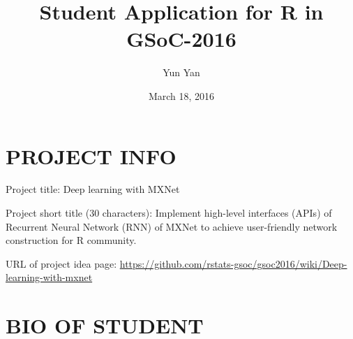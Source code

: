 \documentclass[]{article}
\title{Student Application for R in GSoC-2016}
\author{Yun Yan}
\date{March 18, 2016}
\begin{document}
\maketitle

\section{PROJECT INFO}\label{project-info}

Project title: Deep learning with MXNet

Project short title (30 characters): Implement high-level interfaces
(APIs) of Recurrent Neural Network (RNN) of MXNet to achieve
user-friendly network construction for R community.

URL of project idea page:
\url{https://github.com/rstats-gsoc/gsoc2016/wiki/Deep-learning-with-mxnet}

\section{BIO OF STUDENT}\label{bio-of-student}
\end{document}
